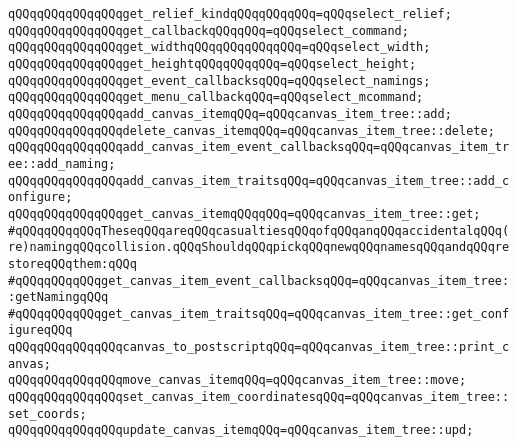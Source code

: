 \verb|qQQqqQQqqQQqqQQqget_relief_kindqQQqqQQqqQQq=qQQqselect_relief;|\newline
\verb|qQQqqQQqqQQqqQQqget_callbackqQQqqQQq=qQQqselect_command;|\newline
\verb|qQQqqQQqqQQqqQQqget_widthqQQqqQQqqQQqqQQq=qQQqselect_width;|\newline
\verb|qQQqqQQqqQQqqQQqget_heightqQQqqQQqqQQq=qQQqselect_height;|\newline
\verb|qQQqqQQqqQQqqQQqget_event_callbacksqQQq=qQQqselect_namings;|\newline
\verb|qQQqqQQqqQQqqQQqget_menu_callbackqQQq=qQQqselect_mcommand;|\newline
\newline
\verb|qQQqqQQqqQQqqQQqadd_canvas_itemqQQq=qQQqcanvas_item_tree::add;|\newline
\verb|qQQqqQQqqQQqqQQqdelete_canvas_itemqQQq=qQQqcanvas_item_tree::delete;|\newline
\newline
\verb|qQQqqQQqqQQqqQQqadd_canvas_item_event_callbacksqQQq=qQQqcanvas_item_tree::add_naming;|\newline
\verb|qQQqqQQqqQQqqQQqadd_canvas_item_traitsqQQq=qQQqcanvas_item_tree::add_configure;|\newline
\newline
\verb|qQQqqQQqqQQqqQQqget_canvas_itemqQQqqQQq=qQQqcanvas_item_tree::get;|\newline
\newline
\verb|#qQQqqQQqqQQqTheseqQQqareqQQqcasualtiesqQQqofqQQqanqQQqaccidentalqQQq(re)namingqQQqcollision.qQQqShouldqQQqpickqQQqnewqQQqnamesqQQqandqQQqrestoreqQQqthem:qQQq|\newline
\verb|#qQQqqQQqqQQqget_canvas_item_event_callbacksqQQq=qQQqcanvas_item_tree::getNamingqQQq|\newline
\verb|#qQQqqQQqqQQqget_canvas_item_traitsqQQq=qQQqcanvas_item_tree::get_configureqQQq|\newline
\verb|qQQqqQQqqQQqqQQqcanvas_to_postscriptqQQq=qQQqcanvas_item_tree::print_canvas;|\newline
\newline
\verb|qQQqqQQqqQQqqQQqmove_canvas_itemqQQq=qQQqcanvas_item_tree::move;|\newline
\verb|qQQqqQQqqQQqqQQqset_canvas_item_coordinatesqQQq=qQQqcanvas_item_tree::set_coords;|\newline
\newline
\verb|qQQqqQQqqQQqqQQqupdate_canvas_itemqQQq=qQQqcanvas_item_tree::upd;|\newline
